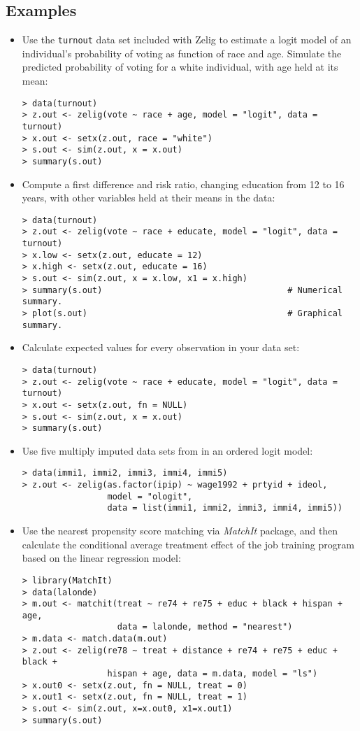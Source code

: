 \subsection{Examples}

\begin{itemize}
\item Use the \texttt{turnout} data set included with Zelig to
  estimate a logit model of an individual's probability of voting as
  function of race and age. Simulate the predicted probability of
  voting for a white individual, with age held at its mean:
\begin{verbatim}
> data(turnout)
> z.out <- zelig(vote ~ race + age, model = "logit", data = turnout)
> x.out <- setx(z.out, race = "white")
> s.out <- sim(z.out, x = x.out)
> summary(s.out)
\end{verbatim} 
\item Compute a first difference and risk ratio, changing education
  from 12 to 16 years, with other variables held at their means in the
  data:
\begin{verbatim}
> data(turnout)
> z.out <- zelig(vote ~ race + educate, model = "logit", data = turnout)
> x.low <- setx(z.out, educate = 12)
> x.high <- setx(z.out, educate = 16)
> s.out <- sim(z.out, x = x.low, x1 = x.high)
> summary(s.out)                                     # Numerical summary.
> plot(s.out)                                        # Graphical summary.
\end{verbatim}
\item Calculate expected values for every observation in your
  data set:
\begin{verbatim}
> data(turnout)
> z.out <- zelig(vote ~ race + educate, model = "logit", data = turnout)
> x.out <- setx(z.out, fn = NULL)
> s.out <- sim(z.out, x = x.out)
> summary(s.out)
\end{verbatim} 

\item Use five multiply imputed data sets from \cite{SchSla01} in an
  ordered logit model:
\begin{verbatim}
> data(immi1, immi2, immi3, immi4, immi5)
> z.out <- zelig(as.factor(ipip) ~ wage1992 + prtyid + ideol,
                 model = "ologit",
                 data = list(immi1, immi2, immi3, immi4, immi5))
\end{verbatim}

\item Use the nearest propensity score matching via {\it MatchIt}
  package, and then calculate the conditional average treatment effect
  of the job training program based on the linear regression model:
\begin{verbatim}
> library(MatchIt)
> data(lalonde)
> m.out <- matchit(treat ~ re74 + re75 + educ + black + hispan + age, 
                   data = lalonde, method = "nearest")
> m.data <- match.data(m.out)
> z.out <- zelig(re78 ~ treat + distance + re74 + re75 + educ + black +
                 hispan + age, data = m.data, model = "ls")
> x.out0 <- setx(z.out, fn = NULL, treat = 0)
> x.out1 <- setx(z.out, fn = NULL, treat = 1)
> s.out <- sim(z.out, x=x.out0, x1=x.out1)
> summary(s.out)
\end{verbatim}


\end{itemize}
